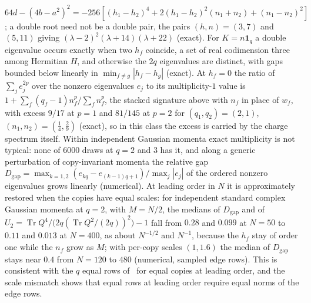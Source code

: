 \(64d-(4b-a^2)^2=-256[(h_1-h_2)^4+2(h_1-h_2)^2(n_1+n_2)+(n_1-n_2)^2]\); a double root need not be a double pair, the pairs \((h,n)=(3,7)\) and \((5,11)\) giving \((\lambda-2)^2(\lambda+14)(\lambda+22)\) (exact). For \(K=n\mathbf 1_q\) a double eigenvalue occurs exactly when two \(h_f\) coincide, a set of real codimension three among Hermitian \(H\), and otherwise the \(2q\) eigenvalues are distinct, with gaps bounded below linearly in \(\min_{f\ne g}|h_f-h_g|\) (exact). At \(h_f=0\) the ratio of \(\sum_je_j^{2p}\) over the nonzero eigenvalues \(e_j\) to its multiplicity-\(1\) value is \(1+\sum_f(q_f-1)n_f^p/\sum_fn_f^p\), the stacked signature above with \(n_f\) in place of \(w_f\), with excess \(9/17\) at \(p=1\) and \(81/145\) at \(p=2\) for \((q_1,q_2)=(2,1)\), \((n_1,n_2)=(\tfrac14,\tfrac29)\) (exact), so in this class the excess is carried by the charge spectrum itself. Within independent Gaussian momenta exact multiplicity is not typical: none of \(6000\) draws at \(q=2\) and \(3\) has it, and along a generic perturbation of copy-invariant momenta the relative gap \(D_{\mathrm{gap}}=\max_{k=1,2}(e_{kq}-e_{(k-1)q+1})/\max_j|e_j|\) of the ordered nonzero eigenvalues grows linearly (numerical). At leading order in \(N\) it is approximately restored when the copies have equal scales: for independent standard complex Gaussian momenta at \(q=2\), with \(M=N/2\), the medians of \(D_{\mathrm{gap}}\) and of \(U_2=\operatorname{Tr}Q^4/\bigl(2q(\operatorname{Tr}Q^2/(2q))^2\bigr)-1\) fall from \(0.28\) and \(0.099\) at \(N=50\) to \(0.11\) and \(0.013\) at \(N=400\), as about \(N^{-1/2}\) and \(N^{-1}\), because the \(h_f\) stay of order one while the \(n_f\) grow as \(M\); with per-copy scales \((1,1.6)\) the median of \(D_{\mathrm{gap}}\) stays near \(0.4\) from \(N=120\) to \(480\) (numerical, sampled edge rows). This is consistent with the \(q\) equal rows of~\cite{Frenkel2023EdgeModes} for equal copies at leading order, and the scale mismatch shows that equal rows at leading order require equal norms of the edge rows.
